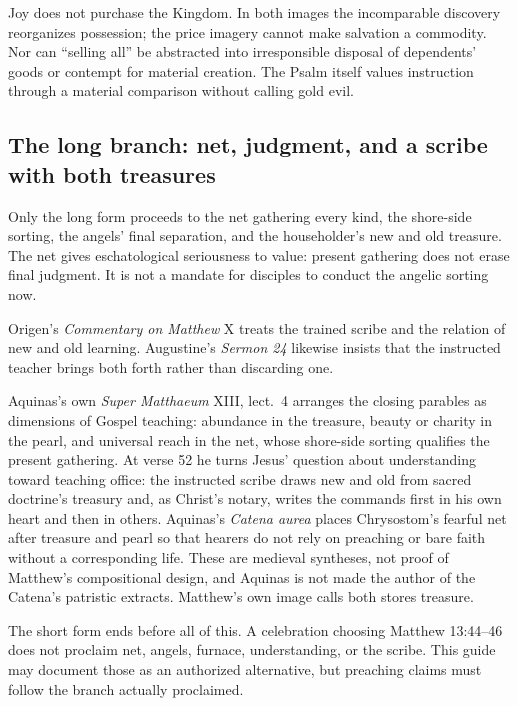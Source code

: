 \begin{deepstudy}
Joy does not purchase the Kingdom. In both images the incomparable discovery reorganizes possession; the price imagery cannot make salvation a commodity. Nor can ``selling all'' be abstracted into irresponsible disposal of dependents' goods or contempt for material creation. The Psalm itself values instruction through a material comparison without calling gold evil.

\sectionguard
\subsection*{The long branch: net, judgment, and a scribe with both treasures\enspace{}}

Only the long form proceeds to the net gathering every kind, the shore-side sorting, the angels' final separation, and the householder's new and old treasure. The net gives eschatological seriousness to value: present gathering does not erase final judgment. It is not a mandate for disciples to conduct the angelic sorting now.

Origen's \emph{Commentary on Matthew} X treats the trained scribe and the relation of new and old learning. Augustine's \emph{Sermon 24} likewise insists that the instructed teacher brings both forth rather than discarding one.

Aquinas's own \emph{Super Matthaeum} XIII, lect.~4 arranges the closing parables as dimensions of Gospel teaching: abundance in the treasure, beauty or charity in the pearl, and universal reach in the net, whose shore-side sorting qualifies the present gathering. At verse 52 he turns Jesus' question about understanding toward teaching office: the instructed scribe draws new and old from sacred doctrine's treasury and, as Christ's notary, writes the commands first in his own heart and then in others. Aquinas's \emph{Catena aurea} places Chrysostom's fearful net after treasure and pearl so that hearers do not rely on preaching or bare faith without a corresponding life. These are medieval syntheses, not proof of Matthew's compositional design, and Aquinas is not made the author of the Catena's patristic extracts. Matthew's own image calls both stores treasure.

The short form ends before all of this. A celebration choosing Matthew 13:44--46 does not proclaim net, angels, furnace, understanding, or the scribe. This guide may document those as an authorized alternative, but preaching claims must follow the branch actually proclaimed.


\end{deepstudy}
